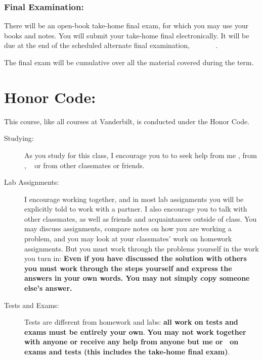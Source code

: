 \documentclass[11pt,twoside]{jgsyllabus}\usepackage[]{graphicx}\usepackage[]{color}
\begin{document}
\subsubsection{Final Examination:}
There will be an open-book take-home final exam, for which you may use your books and notes.
You will submit your take-home final electronically. It will be due at the end
of the scheduled \ifAltFinal alternate \fi final examination,
\ifAltFinal \AltFinalExamEndTime\ \AltFinalExamDay\ \AltFinalExamMonth~\AltFinalExamDate \else
\FinalExamEndTime\ \FinalExamDay\ \FinalExamMonth~\FinalExamDate \fi.
%

The final exam will be cumulative over all the material covered during the term.

\section{Honor Code:}
This course, like all courses at Vanderbilt, is conducted under the Honor Code.
\begin{description}
\item[Studying:] As you study for this class, I encourage you to to seek help from me%
\ifTA
, from \TaTitle,
\else
\
\fi
or from other classmates or friends.
\item[Lab Assignments:] I encourage working together, and in most lab assignments
you will be explicitly told to work with a partner. I also encourage you to
talk with other classmates, as well as friends and acquaintances outside of
class. You may discuss assignments, compare notes on how you are working a
problem, and you may look at your classmates' work on homework assignments.
But you must work through the problems yourself in the work you turn in:
\textbf{Even if you have discussed the solution with others you must
work through the steps yourself and express the answers in your own words.
You may not simply copy someone else's answer.}
\item[Tests and Exams:] Tests are different from homework and labs:
\textbf{all work on tests and exams must be entirely your own}.
\textbf{You may not work together with anyone or receive any help from anyone
but me%
\ifTA
or \TaTitle
\fi
\ on exams and tests (this includes the take-home final exam)}.
\end{description}
\end{document}
